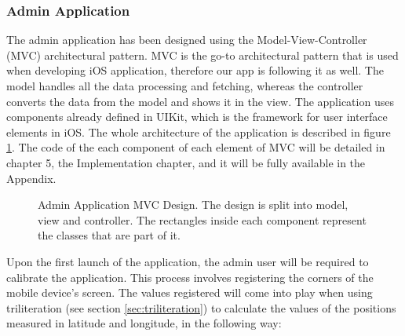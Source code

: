 \subsubsection{Admin Application}
The admin application has been designed using the Model-View-Controller (MVC) architectural pattern. MVC is the go-to architectural pattern that is used when developing iOS application, therefore our app is following it as well. The model handles all the data processing and fetching, whereas the controller converts the data from the model and shows it in the view. The application uses components already defined in UIKit, which is the framework for user interface elements in iOS. The whole architecture of the application is described in figure \ref{fig:admin-mvc}. The code of the each component of each element of MVC will be detailed in chapter 5, the Implementation chapter, and it will be fully available in the Appendix.

\begin{figure}[H]
    \centering
    \centering
    \caption{Admin Application MVC Design. The design is split into model, view and controller. The rectangles inside each component represent the classes that are part of it.}
\label{fig:admin-mvc}
\end{figure}

Upon the first launch of the application, the admin user will be required to calibrate the application. This process involves registering the corners of the mobile device's screen. The values registered will come into play when using triliteration (see section \ref{sec:triliteration}) to calculate the values of the positions measured in latitude and longitude, in the following way:

